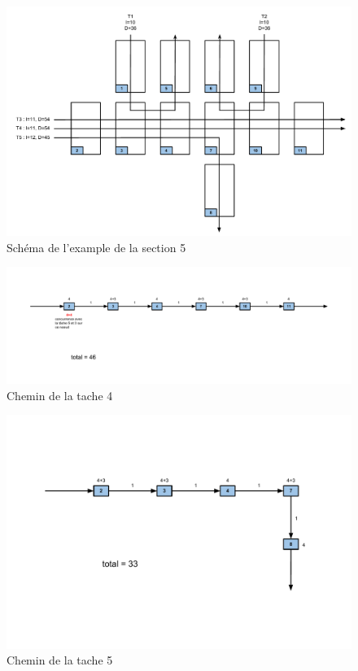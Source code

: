 \documentclass[a4paper,10pt]{article}
\title{}
\author{}
\date{}
\newenvironment{figureH} {%
\begin{figure}[H]
}{%
\end{figure}
}
\begin{document}
\maketitle
  \begin{figureH}
        \includegraphics[width=\textwidth]{images/global.pdf}
        \center
        \caption{Schéma de l'example de la section 5}
        \label{image_global}
    \end{figureH}
    
      \begin{figureH}
        \includegraphics[width=\textwidth]{images/tache4.pdf}
        \center
        \caption{Chemin de la tache 4}
        \label{image_global}
    \end{figureH}
     \begin{figureH}
        \includegraphics[width=\textwidth]{images/tache5.pdf}
        \center
        \caption{Chemin de la tache 5}
        \label{image_global}
    \end{figureH}
\end{document}
